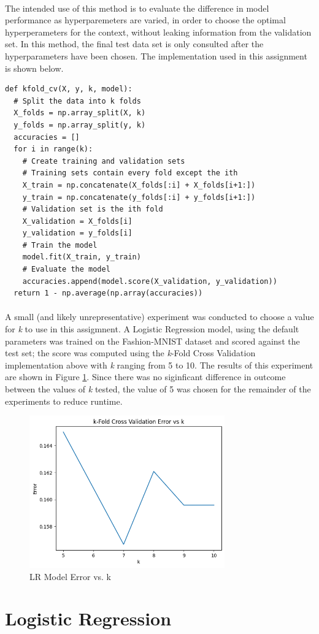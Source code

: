 \documentclass[12pt, letterpaper]{article}
\begin{document}
\paragraph*{}The intended use of this method is to evaluate the difference in
model performance as hyperparemeters are varied, in order to choose the optimal
hyperperameters for the context, without leaking information from the validation set.
In this method, the final test data set is only consulted after the hyperparameters
have been chosen. The implementation used in this assignment is shown below.

\begin{verbatim}
def kfold_cv(X, y, k, model):
  # Split the data into k folds
  X_folds = np.array_split(X, k)
  y_folds = np.array_split(y, k)
  accuracies = []
  for i in range(k):
    # Create training and validation sets
    # Training sets contain every fold except the ith
    X_train = np.concatenate(X_folds[:i] + X_folds[i+1:])
    y_train = np.concatenate(y_folds[:i] + y_folds[i+1:])
    # Validation set is the ith fold
    X_validation = X_folds[i]
    y_validation = y_folds[i]
    # Train the model
    model.fit(X_train, y_train)
    # Evaluate the model
    accuracies.append(model.score(X_validation, y_validation))
  return 1 - np.average(np.array(accuracies))
\end{verbatim}

\paragraph*{}A small (and likely unrepresentative) experiment was conducted
to choose a value for \textit{k} to use in this assigmnent. A Logistic Regression
model, using the default parameters was trained on the Fashion-MNIST dataset
and scored against the test set; the score was computed using the \textit{k}-Fold
Cross Validation implementation above with \textit{k} ranging from 5 to 10.
The results of this experiment are shown in Figure \ref{fig:3}. Since there was
no siginficant difference in outcome between the values of \textit{k} tested,
the value of 5 was chosen for the remainder of the experiments to reduce runtime.

\begin{figure}[ht]
    \centering
    \includegraphics[width=0.75\textwidth]{1.png}
    \caption{LR Model Error vs. k}
    \label{fig:3}
\end{figure}

\section{Logistic Regression}
\end{document}
